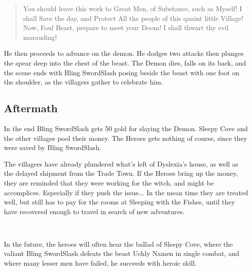 \documentclass[11pt, twoside, titlepage, a4paper]{report}
\newenvironment{readoutloud}%
{\begin{quote}\begin{itshape}}%
{\end{itshape}\end{quote}}%
\begin{document}
\begin{readoutloud}
You should leave this work to Great Men, of Substance, such as Myself! I shall Save the day, and Protect All the people of this quaint little Village! \\
Now, Foul Beast, prepare to meet your Doom! I shall thwart thy evil marauding!
\end{readoutloud}

He then proceeds to advance on the demon. He dodges two attacks then plunges the spear deep into the chest of the beast. The Demon dies, falls on its back, and the scene ends with Bling SwordSlash posing beside the beast with one foot on the shoulder, as the villagers gather to celebrate him.


\subsection*{Aftermath}
In the end Bling SwordSlash gets 50 gold for slaying the Demon. Sleepy Cove and the other villages pool their money. The Heroes gets nothing of course, since they were saved by Bling SwordSlash.

The villagers have already plundered what's left of Dyslexia's house, as well as the delayed shipment from the Trade Town. If the Heroes bring up the money, they are reminded that they were working for the witch, and might be accomplices. Especially if they push the issue... In the mean time they are treated well, but still has to pay for the rooms at Sleeping with the Fishes, until they have recovered enough to travel in search of new adventures.

\

In the future, the heroes will often hear the ballad of Sleepy Cove, where the valiant Bling SwordSlash defeats the beast Uchly Namen in single combat, and where many lesser men have failed, he succeeds with heroic skill.
\end{document}
